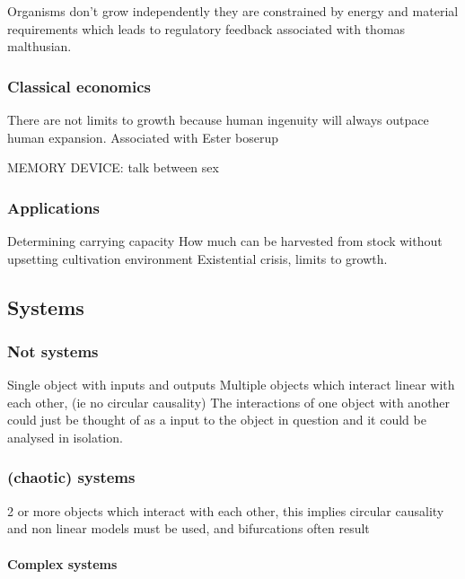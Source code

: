 \documentclass[]{article}
\let\oldparagraph\paragraph
\renewcommand{\paragraph}[1]{\oldparagraph{#1}\mbox{}}
\begin{document}
Organisms don't grow independently they are constrained by energy and
material requirements which leads to regulatory feedback associated with
thomas malthusian.

\hypertarget{classical-economics}{%
\subsubsection{Classical economics}\label{classical-economics}}

There are not limits to growth because human ingenuity will always
outpace human expansion. Associated with Ester boserup

MEMORY DEVICE: talk between sex

\hypertarget{applications}{%
\subsubsection{Applications}\label{applications}}

Determining carrying capacity How much can be harvested from stock
without upsetting cultivation environment Existential crisis, limits to
growth.

\hypertarget{systems}{%
\subsection{Systems}\label{systems}}

\hypertarget{not-systems}{%
\subsubsection{Not systems}\label{not-systems}}

Single object with inputs and outputs Multiple objects which interact
linear with each other, (ie no circular causality) The interactions of
one object with another could just be thought of as a input to the
object in question and it could be analysed in isolation.

\hypertarget{chaotic-systems}{%
\subsubsection{(chaotic) systems}\label{chaotic-systems}}

2 or more objects which interact with each other, this implies circular
causality and non linear models must be used, and bifurcations often
result

\hypertarget{complex-systems}{%
\paragraph{Complex systems}\label{complex-systems}}
\end{document}
